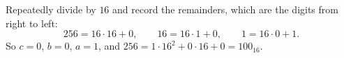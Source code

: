 Repeatedly divide by $16$ and record the remainders, which are the digits from right to left:
\[256=16\cdot16+0,\qquad16=16\cdot1+0,\qquad1=16\cdot0+1.\]
So $c=0$, $b=0$, $a=1$, and $256=1\cdot16^2+0\cdot16+0=\boxed{100_{16}}$.
